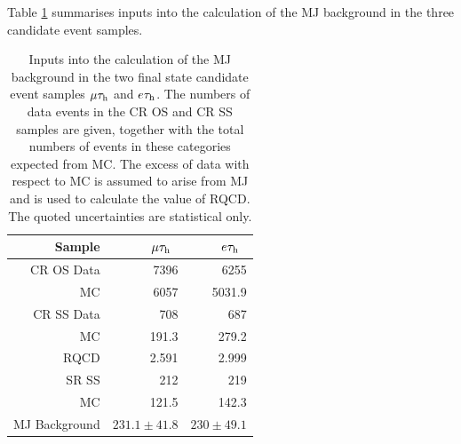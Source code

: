 Table \ref{tab:MJ} summarises inputs into the calculation of the MJ background in the three candidate event samples. 
\begin{table}[htbp]
	\centering
	\begin{tabular}{rrr}
		Sample &             $\mu \tau_\text{h}$\ & $e \tau_\text{h}$\  \\
		\toprule
		CR OS Data &       7396    & 6255   \\
		MC          &       6057    & 5031.9   \\ 
		CR SS Data &       708    & 687    \\
		MC      &       191.3      & 279.2     \\
		\toprule
		RQCD      &      2.591   & 2.999  \\
		\toprule
		SR SS     &      212    & 219   \\
		MC     &       121.5    &  142.3   \\
		\toprule
		MJ Background        &      $231.1 \pm 41.8$    & $230 \pm 49.1$    \\          
		
		
	\end{tabular}
	\caption{Inputs into the calculation of the MJ background in the two final state candidate event samples  $\mu\tau_\text{h}$ and $e\tau_\text{h}$.
		The numbers of data events in the CR OS and CR SS samples are given, together with the total numbers of events in these
		categories expected from MC.
		The excess of data with respect to MC is assumed to arise from MJ and is used to calculate the value of RQCD.
		The quoted uncertainties are statistical only.
	}
	\label{tab:MJ}
\end{table}
 